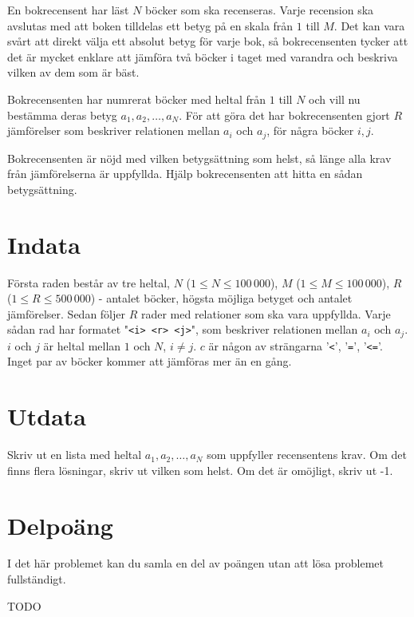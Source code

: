 
En bokrecensent har läst $N$ böcker som ska recenseras. Varje recension ska
avslutas med att boken tilldelas ett betyg på en skala från $1$ till $M$. Det kan
vara svårt att direkt välja ett absolut betyg för varje bok, så
bokrecensenten tycker att det är mycket enklare att jämföra två böcker i
taget med varandra och beskriva vilken av dem som är bäst.

Bokrecensenten har numrerat böcker med heltal från $1$ till $N$ och vill nu
bestämma deras betyg $a_1, a_2, \dots , a_N$. För att göra det har
bokrecensenten gjort $R$ jämförelser som beskriver relationen mellan $a_i$ och
$a_j$, för några böcker $i, j$.

Bokrecensenten är nöjd med vilken betygsättning som helst, så länge alla krav
från jämförelserna är uppfyllda. Hjälp bokrecensenten att hitta en sådan
betygsättning.

\section*{Indata}

Första raden består av tre heltal, $N$ ($1 \leq N \leq 100\,000$), 
$M$ ($1 \leq M \leq 100\,000$),
$R$ ($1 \leq R \leq 500\,000$) - antalet böcker, högsta möjliga
betyget och antalet jämförelser. Sedan följer $R$ rader med relationer som ska
vara
uppfyllda. Varje sådan rad har formatet "\texttt{<i> <r> <j>}",
som beskriver relationen mellan $a_i$ och $a_j$. $i$ och $j$ är heltal mellan
$1$ och $N$, $i \neq j$. $c$ är någon av strängarna '\texttt{<}', '\texttt{=}',
'\texttt{<=}'. Inget par av böcker kommer att jämföras mer än en gång.

\section*{Utdata}

Skriv ut en lista med heltal $a_1, a_2, \ldots , a_N$ som uppfyller recensentens
krav. Om det finns flera lösningar, skriv ut vilken som helst. Om det är
omöjligt, skriv ut -1.

\section*{Delpoäng}

I det här problemet kan du samla en del av poängen utan att
lösa problemet fullständigt.

TODO

